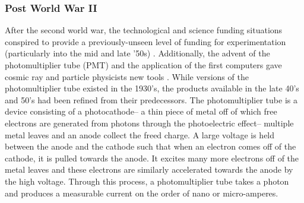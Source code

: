 \subsubsection*{Post World War II}
After the second world war, the technological and science funding situations conspired to provide a previously-unseen level of funding for experimentation (particularly into the mid and late '50s) \cite{scifund1}. Additionally, the advent of the photomultiplier tube (PMT) and the application of the first computers gave cosmic ray and particle physicists new tools \cite{pmthistory}. While versions of the photomultiplier tube existed in the 1930's, the products available in the late 40's and 50's had been refined from their predecessors. The photomultiplier tube is a device consisting of a photocathode-- a thin piece of metal off of which free electrons are generated from photons through the photoelectric effect-- multiple metal leaves and an anode collect the freed charge. A large voltage is held between the anode and the cathode such that when an electron comes off of the cathode, it is pulled towards the anode. It excites many more electrons off of the metal leaves and these electrons are similarly accelerated towards the anode by the high voltage. Through this process, a photomultiplier tube takes a photon and produces a measurable current on the order of nano or micro-amperes. 


